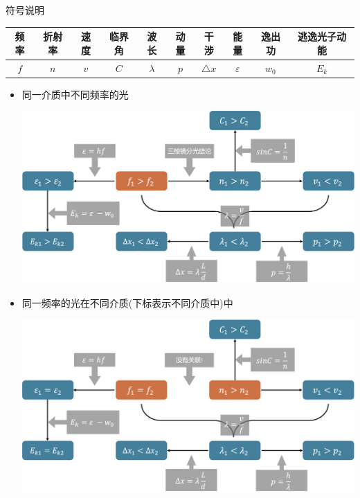 \documentclass{article}
\begin{document}
\vspace{5em}

符号说明

\begin{tabular}{|c|c|c|c|c|c|c|c|c|c|}
    \hline
    频率  & 折射率 & 速度  & 临界角 & 波长        & 动量  & 干涉            & 能量            & 逸出功     & 逃逸光子动能  \\
    \hline
    $f$ & $n$ & $v$ & $C$ & $\lambda$ & $p$ & $\triangle x$ & $\varepsilon$ & $w_{0}$ & $E_{k}$ \\
    \hline
\end{tabular}

\vspace*{2em}

\begin{itemize}
    \item 同一介质中不同频率的光

          \vspace*{1em}
          \includegraphics[width=35em,keepaspectratio]{./pictures/22.png}

          \vspace*{2em}

    \item 同一频率的光在不同介质(下标表示不同介质中)中

          \vspace*{1em}
          \includegraphics[width=35em,keepaspectratio]{./pictures/23.png}
\end{itemize}
\end{document}
